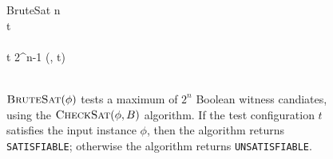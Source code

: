 

\begin{figure}[htbp]
\begin{center}

\begin{pseudocode}{BruteSat}{\phi}
	n \phi \\
	t   \\
\\
	\FOR t   2^n-1 \DO
		\BEGIN
			\IF {}(\phi, t) 
				\THEN	{} \\

		\END \\
\end{pseudocode}

\caption{$\text{\sc BruteSat}(\phi)$ tests a maximum of $2^n$ Boolean witness candiates, using the $\text{\sc CheckSat}(\phi, B)$ algorithm.  If the test configuration $t$ satisfies the input instance $\phi$, then the algorithm returns \texttt{SATISFIABLE}; otherwise the algorithm returns \texttt{UNSATISFIABLE}.}
\label{bruteSat}
\end{center}
\end{figure}
